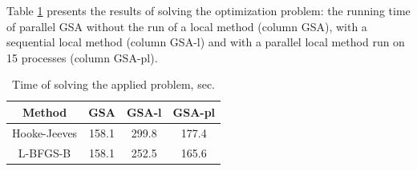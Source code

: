 \documentclass[runningheads]{llncs}
\begin{document}
%

Table \ref{tab:12} presents the results of solving the optimization problem: the running time of parallel GSA without the run of a local method (column GSA), with a sequential local method (column GSA-l) and with a parallel local method run on 15 processes (column GSA-pl).

\begin{table}[ht]
	\caption{Time of solving the applied problem, sec.}
	\label{tab:12}
	\center
		\begin{tabular}{|c|c|c|c|}
		\hline
		Method & GSA & GSA-l & GSA-pl \\
		\hline 
		Hooke-Jeeves & 158.1 & 299.8  & 177.4 \\
		\hline
		L-BFGS-B & 158.1  & 252.5  & 165.6  \\
		\hline
	\end{tabular}
\end{table}

%
\end{document}
